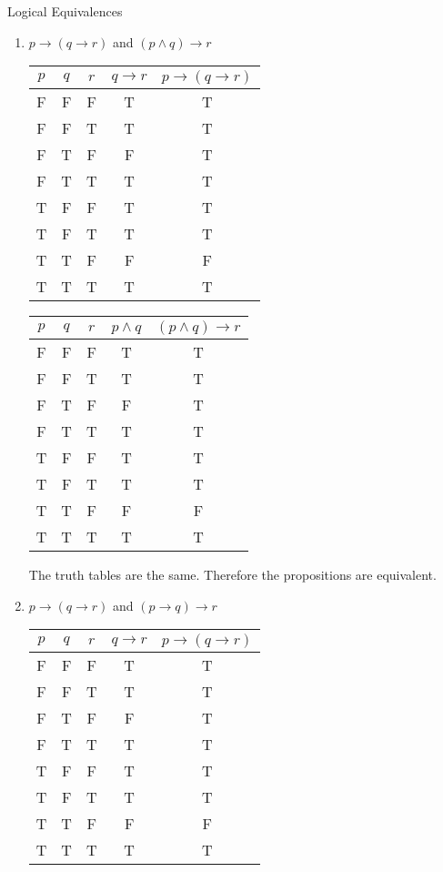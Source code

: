 \documentclass[11pt]{article}
\begin{document}
Logical Equivalences
\begin{enumerate}

\item
$p \rightarrow (q \rightarrow r)$ and $(p \land q) \rightarrow r$

\begin{center}
\begin{tabular}{|c|c|c|c|c|}
\hline
$p$ & $q$ & $r$ & $q \rightarrow r$ & $p \rightarrow (q \rightarrow r)$\\
\hline
F & F & F & T & T\\
F & F & T & T & T\\
F & T & F & F & T\\
F & T & T & T & T\\
T & F & F & T & T\\
T & F & T & T & T\\
T & T & F & F & F\\
T & T & T & T & T\\
\hline
\end{tabular}
\end{center}

\begin{center}
\begin{tabular}{|c|c|c|c|c|}
\hline
$p$ & $q$ & $r$ & $p \land q$ & $(p \land q) \rightarrow r$\\
\hline
F & F & F & T & T\\
F & F & T & T & T\\
F & T & F & F & T\\
F & T & T & T & T\\
T & F & F & T & T\\
T & F & T & T & T\\
T & T & F & F & F\\
T & T & T & T & T\\
\hline
\end{tabular}
\end{center}

The truth tables are the same. Therefore the propositions are equivalent.

\item
$p \rightarrow (q \rightarrow r)$ and $(p \rightarrow q) \rightarrow r$

\begin{center}
\begin{tabular}{|c|c|c|c|c|}
\hline
$p$ & $q$ & $r$ & $q \rightarrow r$ & $p \rightarrow (q \rightarrow r)$\\
\hline
F & F & F & T & T\\
F & F & T & T & T\\
F & T & F & F & T\\
F & T & T & T & T\\
T & F & F & T & T\\
T & F & T & T & T\\
T & T & F & F & F\\
T & T & T & T & T\\
\hline
\end{tabular}
\end{center}


\end{enumerate}
\end{document}
